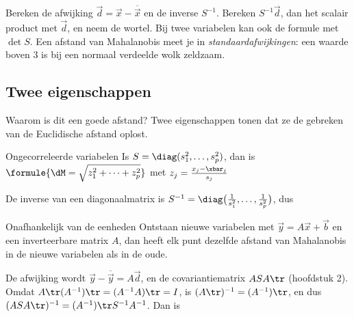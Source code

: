 \begin{werkwijze}
Bereken de afwijking $\vec d = \vec x - \overline{\vec x}$ en de inverse $S^{-1}$. Bereken $S^{-1}\vec d$, dan het scalair product met $\vec d$, en neem de wortel. Bij twee variabelen kan ook de formule met $\det S$. Een afstand van Mahalanobis meet je in \textit{standaardafwijkingen}: een waarde boven 3 is bij een normaal verdeelde wolk zeldzaam.
\end{werkwijze}

\begin{oefeningen}
\end{oefeningen}

\subsection{Twee eigenschappen}

Waarom is dit een goede afstand? Twee eigenschappen tonen dat ze de gebreken van de Euclidische afstand oplost.

\begin{theorie}
\begin{stelling}{Ongecorreleerde variabelen}
Is $S = \diag(s_1^2, \ldots, s_p^2)$, dan is \qquad $\formule{\dM = \sqrt{z_1^2 + \cdots + z_p^2}}$ \qquad met $z_j = \frac{x_j - \xbar_j}{s_j}$
\end{stelling}

\begin{bewijs}
De inverse van een diagonaalmatrix is $S^{-1} = \diag\bigl(\frac{1}{s_1^2}, \ldots, \frac{1}{s_p^2}\bigr)$, dus
\end{bewijs}

\begin{stelling}{Onafhankelijk van de eenheden}
Ontstaan nieuwe variabelen met $\vec y = A\vec x + \vec b$ en een inverteerbare matrix $A$, dan heeft elk punt dezelfde afstand van Mahalanobis in de nieuwe variabelen als in de oude.
\end{stelling}

\begin{bewijs}
De afwijking wordt $\vec y - \overline{\vec y} = A\vec d$, en de covariantiematrix $ASA\tr$ (hoofdstuk 2). Omdat $A\tr(A^{-1})\tr = (A^{-1}A)\tr = I$, is $(A\tr)^{-1} = (A^{-1})\tr$, en dus $(ASA\tr)^{-1} = (A^{-1})\tr S^{-1}A^{-1}$. Dan is
\end{bewijs}
\end{theorie}

